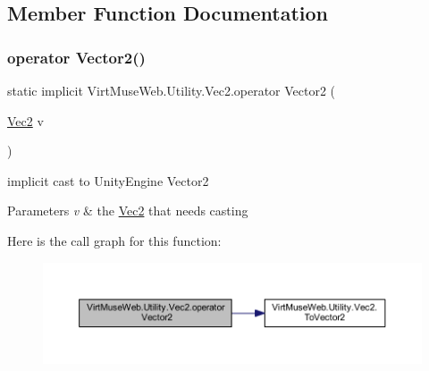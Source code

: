\subsection{Member Function Documentation}
\mbox{\label{class_virt_muse_web_1_1_utility_1_1_vec2_ae7eea094143341c9797862761fd1b6d9}} 
\subsubsection{\texorpdfstring{operator Vector2()}{operator Vector2()}}
{\footnotesize\ttfamily static implicit Virt\+Muse\+Web.\+Utility.\+Vec2.\+operator Vector2 (\begin{DoxyParamCaption}\item[{\mbox{\hyperlink{class_virt_muse_web_1_1_utility_1_1_vec2}{Vec2}}}]{v }\end{DoxyParamCaption})\hspace{0.3cm}{\ttfamily [static]}}



implicit cast to Unity\+Engine Vector2 


\begin{DoxyParams}{Parameters}
{\em v} & the \mbox{\hyperlink{class_virt_muse_web_1_1_utility_1_1_vec2}{Vec2}} that needs casting\\
\hline
\end{DoxyParams}
Here is the call graph for this function\+:
\nopagebreak
\begin{figure}[H]
\begin{center}
\leavevmode
\includegraphics[width=350pt]{class_virt_muse_web_1_1_utility_1_1_vec2_ae7eea094143341c9797862761fd1b6d9_cgraph}
\end{center}
\end{figure}
\mbox{\label{class_virt_muse_web_1_1_utility_1_1_vec2_adf9d148c0badd947b5655efbc24f560e}} 
